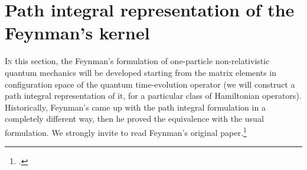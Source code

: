 
\section{Path integral representation of the Feynman's kernel}

\label{sec:PI construction}


\lettrine{I}{n} this section, the Feynman's formulation of one-particle
non-relativistic quantum mechanics
will be developed starting from the matrix elements in configuration space of
the quantum time-evolution operator (we will construct a path integral
representation of it, for a particular class of Hamiltonian operators).
Historically, Feynman's came up with the path integral formulation in a
completely different way, then he proved the equivalence with the usual
formulation. We strongly invite to read Feynman's original
paper.\footcite{Feynman:1948}



